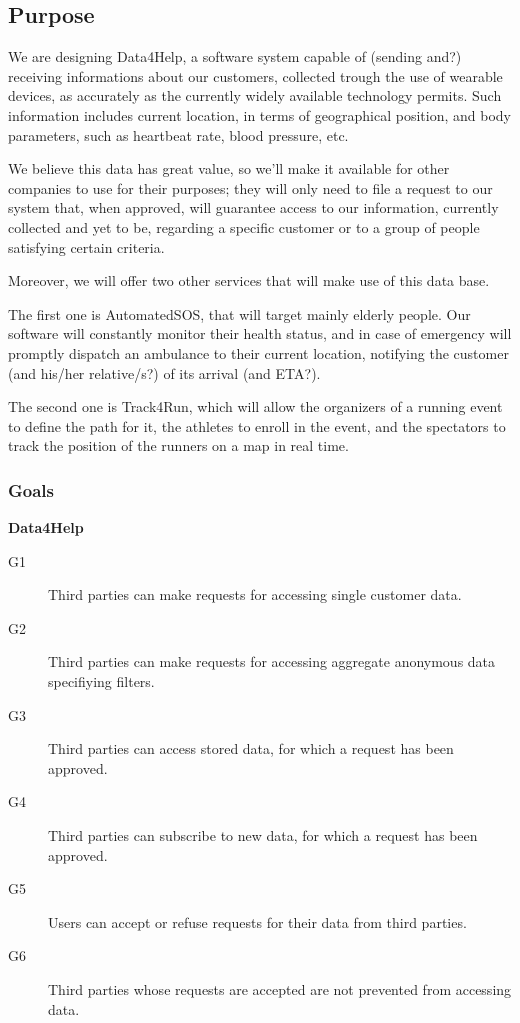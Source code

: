 \documentclass[../main.tex]{subfiles}
\begin{document}
\vspace{8mm}
\subsection{Purpose}

We are designing Data4Help, a software system capable of (sending and?) receiving informations about our customers, collected trough the use of wearable devices, as accurately as the currently widely available technology permits.
Such information includes current location, in terms of geographical position, and body parameters, such as heartbeat rate, blood pressure, etc.

We believe this data has great value, so we'll make it available for other companies to use for their purposes; they will only need to file a request to our system that, when approved, will guarantee access to our information, currently collected and yet to be, regarding a specific customer or to a group of people satisfying certain criteria.

Moreover, we will offer two other services that will make use of this data base.

The first one is AutomatedSOS, that will target mainly elderly people. Our software will constantly monitor their health status, and in case of emergency will promptly dispatch an ambulance to their current location, notifying the customer (and his/her relative/s?) of its arrival (and ETA?).

The second one is Track4Run, which will allow the organizers of a running event to define the path for it, the athletes to enroll in the event, and the spectators to track the position of the runners on a map in real time.


\vspace{8mm}
\subsubsection{Goals}

\vspace{2mm}
{\bf Data4Help}
\begin{description}
	\item [G1]  Third parties can make requests for accessing single customer data.
	\item [G2]  Third parties can make requests for accessing aggregate anonymous data specifiying filters.
	\item [G3]  Third parties can access stored data, for which a request has been approved.
	\item [G4]  Third parties can subscribe to new data, for which a request has been approved.
	\item [G5]  Users can accept or refuse requests for their data from third parties.
	\item [G6]  Third parties whose requests are accepted are not prevented from accessing data.
\end{description}
\end{document}
